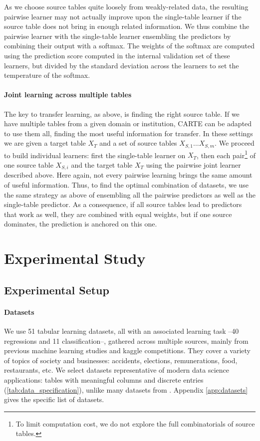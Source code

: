 \documentclass{article}
\theoremstyle{plain}
\theoremstyle{definition}
\theoremstyle{remark}
\begin{document}
As we choose source tables quite loosely from weakly-related data, the resulting pairwise learner may not actually improve upon the single-table learner if the source table does not bring in enough related information. We thus combine the pairwise learner with the single-table learner  ensembling the predictors by combining their output with a softmax. The weights of the softmax are computed using the prediction score computed in the internal validation set of these learners, but divided by the standard deviation across the learners to set the temperature of the softmax.


\paragraph{Joint learning across multiple tables} The key to transfer learning, as above, is finding the right source table. If we have multiple tables from a given domain or institution, CARTE can be adapted to use them all, finding the most useful information for transfer. In these settings we are given a target table $X_{T}$ and a set of source tables ${X_{S,1}...X_{S,m}}$. We proceed to build individual learners: first the single-table learner on $X_T$, then each pair\footnote{To limit computation cost, we do not explore the full combinatorials of source tables.} of one source table $X_{S,i}$ and the target table $X_T$ using the pairwise joint learner described above. Here again, not every pairwise learning brings the same amount of useful information. Thus, to find the optimal combination of datasets, we use the same strategy as above of ensembling all the pairwise predictors as well as the single-table predictor. As a consequence, if all source tables lead to predictors that work as well, they are combined with equal weights, but if one source dominates, the prediction is anchored on this one.

\section{Experimental Study}\label{sec:experiments}

\subsection{Experimental Setup}

\paragraph{Datasets} We use 51 tabular learning datasets, all with an associated learning task --40 regressions and 11 classification--, gathered across multiple sources, mainly from previous machine learning studies and kaggle competitions. They cover a variety of topics of society and businesses: accidents, elections, remunerations, food, restaurants, etc. We select datasets representative of modern data science applications: tables with meaningful columns and discrete entries (\autoref{tab:data_specification}), unlike many datasets from \citet{uci}. Appendix \ref{app:datasets} gives the specific list of datasets.
\end{document}
